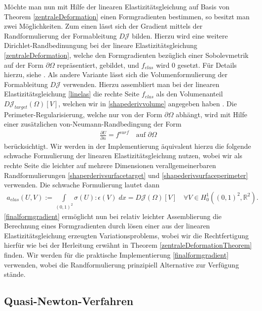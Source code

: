 Möchte man nun mit Hilfe der linearen Elastizitätsgleichung auf Basis von Theorem \ref{zentraleDeformation} einen Formgradienten bestimmen, so besitzt man zwei Möglichkeiten. Zum einen lässt sich der Gradient mittels der Randformulierung der Formableitung $D\mathcal{J}$ bilden. Hierzu wird eine weitere Dirichlet-Randbedinungung bei der lineare Elastizitätsgleichung \ref{zentraleDeformation}, welche den Formgradienten bezüglich einer Sobolevmetrik auf der Form $\partial\Omega$ repräsentiert, gebildet, und $f_{elas}$ wird $0$ gesetzt. Für Details hierzu, siehe \cite{bfgs2}.
Als andere Variante lässt sich die Volumenformulierung der Formableitung $D\mathcal{J}$ verwenden. Hierzu assembliert man bei der linearen Elastizitätsgleichung \ref{linelas} die rechte Seite $f_{elas}$ als den Volumenanteil $D\mathcal{J}_{target}(\Omega)[V]$, welchen wir in \ref{shapederivvolume} angegeben haben . Die Perimeter-Regularisierung, welche nur von der Form $\partial\Omega$ abhängt, wird mit Hilfe einer zusätzlichen von-Neumann-Randbedingung der Form
\begin{align*}
	\frac{\partial U}{\partial n} = f^{surf} \quad \text{auf } \partial\Omega
\end{align*}
berücksichtigt. Wir werden in der Implementierung äquivalent hierzu die folgende schwache Formulierung der linearen Elastizitätsgleichung nutzen, wobei wir als rechte Seite die leichter auf mehrere Dimensionen verallgemeinerbaren Randformulierungen \ref{shaperderivsurfacetarget} und \ref{shapederivsurfaceperimeter} verwenden. Die schwache Formulierung lautet dann
\begin{equation}\label{finalformgradient}
	\begin{aligned}
		a_{elas}(U,V) := \underset{(0,1)^2}{\int}\sigma(U):\epsilon(V) \;dx = D\mathcal{J}(\Omega)[V] \quad \forall V\in H^1_0((0,1)^2, \mathbb{R}^2).
	\end{aligned}
\end{equation}
\ref{finalformgradient} ermöglicht nun bei relativ leichter Assemblierung die Berechnung eines Formgradienten durch lösen einer aus der linearen Elastizitätsgleichung erzeugten Variationsproblems, wobei wir die Rechtfertigung hierfür wie bei der Herleitung erwähnt in Theorem \ref{zentraleDeformationTheorem} finden. Wir werden für die praktische Implementierung \ref{finalformgradient} verwenden, wobei die Randformulierung prinzipiell Alternative zur Verfügung stände. 

\subsection{Quasi-Newton-Verfahren}

